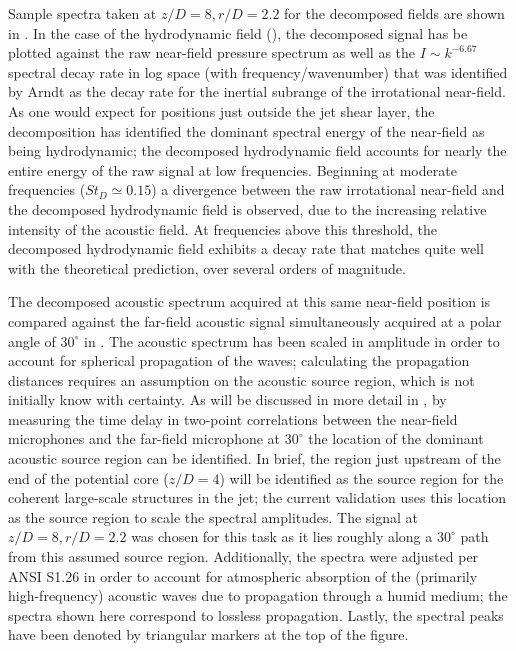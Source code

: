 Sample spectra taken at $z/D = 8, r/D = 2.2$ for the decomposed fields are shown in .
In the case of the hydrodynamic field (), the decomposed signal has be plotted against the raw near-field pressure spectrum as well as the $I \sim k^{-6.67}$ spectral decay rate in log space (with frequency/wavenumber) that was identified by Arndt \etal \citep{Arndt1997} as the decay rate for the inertial subrange of the irrotational near-field.
As one would expect for positions just outside the jet shear layer, the decomposition has identified the dominant spectral energy of the near-field as being hydrodynamic; the decomposed hydrodynamic field accounts for nearly the entire energy of the raw signal at low frequencies.
Beginning at moderate frequencies ($St_D \simeq 0.15$) a divergence between the raw irrotational near-field and the decomposed hydrodynamic field is observed, due to the increasing relative intensity of the acoustic field.
At frequencies above this threshold, the decomposed hydrodynamic field exhibits a decay rate that matches quite well with the theoretical prediction, over several orders of magnitude. 

The decomposed acoustic spectrum acquired at this same near-field position is compared against the far-field acoustic signal simultaneously acquired at a polar angle of $30^\circ$ in .
The acoustic spectrum has been scaled in amplitude in order to account for spherical propagation of the waves; calculating the propagation distances requires an assumption on the acoustic source region, which is not initially know with certainty.
As will be discussed in more detail in , by measuring the time delay in two-point correlations between the near-field microphones and the far-field microphone at $30^\circ$ the location of the dominant acoustic source region can be identified. 
In brief, the region just upstream of the end of the potential core ($z/D =4$) will be identified as the source region for the coherent large-scale structures in the jet; the current validation uses this location as the source region to scale the spectral amplitudes.
The signal at $z/D = 8, r/D = 2.2$ was chosen for this task as it lies roughly along a $30^\circ$ path from this assumed source region.
Additionally, the spectra were adjusted per ANSI S1.26 \citep{ANS1995} in order to account for atmospheric absorption of the (primarily high-frequency) acoustic waves due to propagation through a humid medium; the spectra shown here correspond to lossless propagation.
Lastly, the spectral peaks have been denoted by triangular markers at the top of the figure. 


